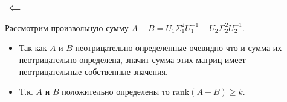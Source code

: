 \documentclass[12pt]{exam}
\begin{document}
\subsection*{$\Leftarrow$}
Рассмотрим произвольную сумму $A + B = U_1 \Sigma_1^2 U_1^{-1} + U_2 \Sigma_2^2 U_2^{-1}$. \\
\begin{itemize}
    \item Так как $A$ и $B$ неотрицательно определенные очевидно что и сумма их неотрицательно определена, 
    значит сумма этих матриц имеет неотрицательные собственные значения.
    \item Т.к. $A$ и $B$ положительно определены то $\mathrm{rank}(A + B) \geq k$.
\end{itemize}

 
\end{document}
